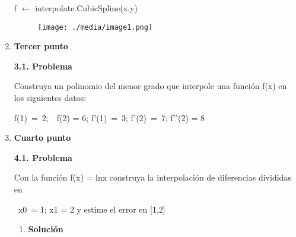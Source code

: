\documentclass[12pt]{article}
\renewcommand{\_}{\kern-1.5pt\textunderscore\kern-1.5pt}
\begin{document}
\begin{enumerate}[label*={\fontsize{14pt}{14pt}\selectfont \textbf{\arabic*.}}]
f $ \leftarrow $  interpolate.CubicSpline(x,y)\par


\vspace{\baselineskip}



\begin{figure}[H]
	\begin{Center}
		\texttt{[image: ./media/image1.png]}
	\end{Center}
\end{figure}



\par


\vspace{\baselineskip}
	\item {\fontsize{14pt}{16.8pt}\selectfont \textbf{Tercer punto}\par}\par

\textbf{3.1. Problema}\par

Construya un polinomio del menor grado que interpole una función f(x) en los siguientes datos: \par

f(1)\ =\ 2;\ \  f(2) = 6;   f’(1)\ =\ 3;   f’(2)\ =\ 7;   f’’(2) = 8\par


\vspace{\baselineskip}
	\item {\fontsize{14pt}{16.8pt}\selectfont \textbf{Cuarto punto}\par}\par

\textbf{4.1. Problema}\par

Con la función f(x) = lnx construya la interpolación de diferencias divididas en\par

\ x0\ = 1;   x1 = 2 y estime el error en [1,2]\par

\begin{enumerate}[label*={\fontsize{12pt}{12pt}\selectfont \textbf{\arabic*.}}]
	\item \textbf{Solución}\par




\end{enumerate}
\end{enumerate}
\end{document}
